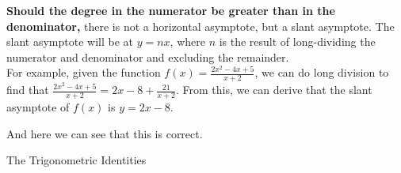 \documentclass[12pt]{article}
\begin{document}
    \begin{center}
    \end{center}

    \textbf{Should the degree in the numerator be greater than in the denominator,} there is not a horizontal asymptote, but a slant asymptote. The slant asymptote will be at \(y=nx\), where \(n\) is the result of long-dividing the numerator and denominator and excluding the remainder.\\
    For example, given the function \(f(x)=\frac{2x^2-4x+5}{x+2}\), we can do long division to find that \(\frac{2x^2-4x+5}{x+2}=2x-8+\frac{21}{x+2}\). From this, we can derive that the slant asymptote of \(f(x)\) is \(y=2x-8\).

    \begin{center}
    \end{center}

    And here we can see that this is correct.

    \begin{center}
        {\large The Trigonometric Identities}
    \end{center}
\end{document}
